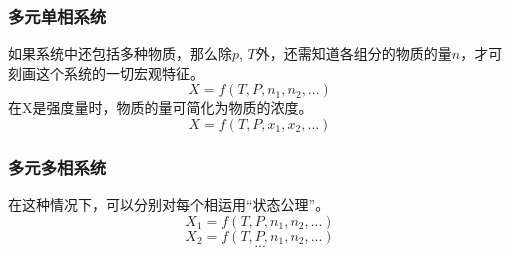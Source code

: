 \subsubsection{多元单相系统}
如果系统中还包括多种物质，那么除$p$, $T$外，还需知道各组分的物质的量$n$，才可刻画这个系统的一切宏观特征。
\begin{equation}
X=f(T,P,n_1, n_2, ...)
\end{equation}
在X是强度量时，物质的量可简化为物质的浓度。
\begin{equation}
X=f(T,P,x_1, x_2, ...)
\end{equation}

\subsubsection{多元多相系统}
在这种情况下，可以分别对每个相运用“状态公理”。
\begin{equation}
X_1=f(T,P,n_1, n_2, ...)
\end{equation}
\begin{equation}
X_2=f(T,P,n_1, n_2, ...)
\end{equation}
$$...$$
